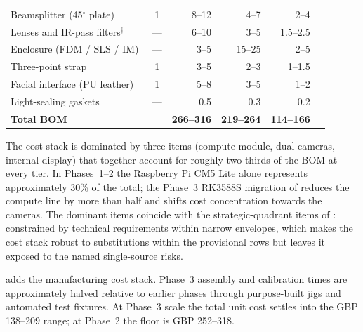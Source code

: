 \begin{table}[htbp]
\begin{tabular}{lcrrrl}
        \midrule
        Beamsplitter (45$^\circ$ plate)         & 1   & 8--12    & 4--7    & 2--4      & \cite{edmund-optics-source} \\
        Lenses and IR-pass filters$^\dagger$    & --- & 6--10    & 3--5    & 1.5--2.5  & \cite{edmund-optics-source} \\
        \midrule
        Enclosure (FDM / SLS / IM)$^\dagger$    & --- & 3--5     & 15--25  & 2--5      & \cite{3dprintuk-source, modernmoulds-source} \\
        Three-point strap                       & 1   & 3--5     & 2--3    & 1--1.5    & \cite{retail-uk-source, volume-supplier-source} \\
        Facial interface (PU leather)           & 1   & 5--8     & 3--5    & 1--2      & \cite{retail-uk-source, volume-supplier-source} \\
        Light-sealing gaskets                   & --- & 0.5      & 0.3     & 0.2       & \cite{digikey-source} \\
        \midrule
        \textbf{Total BOM}                      &     & \textbf{266--316} & \textbf{219--264} & \textbf{114--166} & \\
        \bottomrule
    \end{tabular}
\end{table}

The cost stack is dominated by three items (compute module, dual cameras, internal display) that together account for roughly two-thirds of the BOM at every tier. In Phases~1--2 the Raspberry Pi CM5 Lite alone represents approximately 30\% of the total; the Phase~3 RK3588S migration of  reduces the compute line by more than half and shifts cost concentration towards the cameras. The dominant items coincide with the strategic-quadrant items of : constrained by technical requirements within narrow envelopes, which makes the cost stack robust to substitutions within the provisional rows but leaves it exposed to the named single-source risks.

 adds the manufacturing cost stack. Phase~3 assembly and calibration times are approximately halved relative to earlier phases through purpose-built jigs and automated test fixtures. At Phase~3 scale the total unit cost settles into the GBP 138--209 range; at Phase~2 the floor is GBP 252--318.

